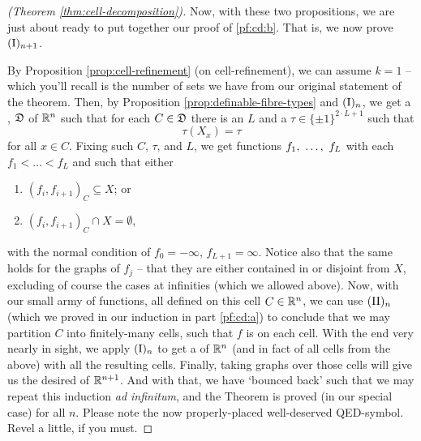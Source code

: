 \begin{proof}[\CD (Theorem \ref{thm:cell-decomposition})]
    Now, with these two propositions, we are just about ready to put together our proof of \ref{pf:cd:b}. That is, we now prove $\In[n+1]$.

    By Proposition \ref{prop:cell-refinement} (on cell-refinement), we can assume $k = 1$ -- which you'll recall is the number of sets we have from our original statement of the theorem. Then, by Proposition \ref{prop:definable-fibre-types} and $\In$, we get a \cd, $\fancyD$ of $\R^n$ such that for each $C \in \fancyD$ there is an $L$ and a $\tau \in \{\pm 1\}^{2 \cdot L + 1} $ such that
    $$
      \tau(X_x) = \tau
    $$
    for all $x \in C$. Fixing such $C$, $\tau$, and $L$, we get  functions $\vonevm{f}{L}$ with each $f_1 < \hdots < f_L$ and such that either
    \begin{enumerate}
      \item $(f_i, f_{i+1})_C \subseteq X$; or
      \item $(f_i, f_{i+1})_C \cap X = \emptyset$,
    \end{enumerate}
    with the normal condition of $f_0 = - \infty$, $f_{L+1} = \infty$. Notice also that the same holds for the graphs of $f_j$ -- that they are either contained in or disjoint from $X$, excluding of course the cases at infinities (which we allowed above). Now, with our small army of  functions, all defined on this cell $C \in \R^n$, we can use $\IIn$ (which we proved in our induction in part \ref{pf:cd:a}) to conclude that we may partition $C$ into finitely-many cells, such that $f$ is \cont on each cell. With the end very nearly in sight, we apply $\In$ to get a \cd of $\R^n$ (and in fact of all cells from the above) \cmptble with all the resulting cells. Finally, taking graphs over those cells will give us the desired \cd of $\R^{n+1}$. And with that, we have `bounced back' such that we may repeat this induction \textit{ad infinitum}, and the \CD Theorem is proved (in our special case) for all $n$. Please note the now properly-placed well-deserved QED-symbol. Revel a little, if you must.
\end{proof}


